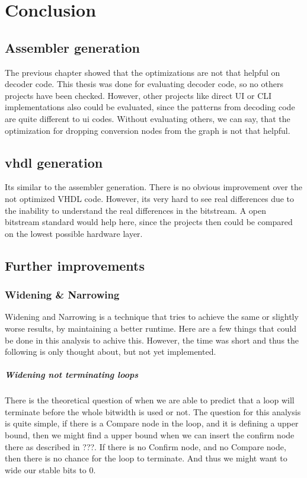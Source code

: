 \chapter{Conclusion}\label{sec:conclusion}

\section{Assembler generation}
The previous chapter showed that the optimizations are not that helpful on decoder code. This thesis was done for evaluating decoder code, so no others projects have been checked. However, other projects like direct UI or CLI implementations also could be evaluated, since the patterns from decoding code are quite different to ui codes. Without evaluating others, we can say, that the optimization for dropping conversion nodes from the graph is not that helpful.

\section{vhdl generation}
Its similar to the assembler generation. There is no obvious improvement over the not optimized VHDL code. However, its very hard to see real differences due to the inability to understand the real differences in the bitstream. A open bitstream standard would help here, since the projects then could be compared on the lowest possible hardware layer.
\section{Further improvements}
\subsection{Widening \& Narrowing}

Widening and Narrowing is a technique that tries to achieve the same or slightly worse results, by maintaining a better runtime. Here are a few things that could be done in this analysis to achive this. However, the time was short and thus the following is only thought about, but not yet implemented.

\paragraph{Widening not terminating loops}
There is the theoretical question of when we are able to predict that a loop will terminate before the whole bitwidth is used or not. The question for this analysis is quite simple, if there is a Compare node in the loop, and it is defining a upper bound, then we might find a upper bound when we can insert the confirm node there as described in ???. If there is no Confirm node, and no Compare node, then there is no chance for the loop to terminate. And thus we might want to wide our stable bits to 0.

